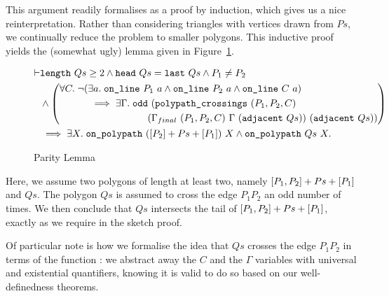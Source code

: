 This argument readily formalises as a proof by induction, which gives us a nice reinterpretation. Rather than considering triangles with vertices drawn from $Ps$, we continually reduce the problem to smaller polygons. This inductive proof yields the (somewhat ugly) lemma given in Figure~\ref{fig:oddCrossClosedPolypath}.

\begin{figure}
\begin{equation}\label{eq:oddCrossClosedPolypath}
  \begin{aligned}
    \vdash&\texttt{length}\ Qs \geq 2 \wedge \texttt{head}\ Qs = \texttt{last}\ Qs\wedge P_1\neq P_2\\
    &\wedge \left(\begin{aligned}&\forall C.\; \neg(\exists a.\; \texttt{on\_line}\ P_1\ a\wedge \texttt{on\_line}\ P_2\ a\wedge \texttt{on\_line}\ C\ a)\\
    &\qquad\quad \implies \exists \Gamma.\; \texttt{odd}\ (\texttt{polypath\_crossings}\ (P_1,P_2,C)\\
    &\qquad\quad\qquad\qquad\qquad(\Gamma_{final}\ (P_1,P_2,C)\ \Gamma\ (\texttt{adjacent}\ Qs))\ (\texttt{adjacent}\ Qs))\end{aligned}\right)\\
    &\implies\exists X.\; \texttt{on\_polypath}\ ([P_2] + Ps + [P_1])\ X \wedge \texttt{on\_polypath}\ Qs\ X.
  \end{aligned}
\end{equation}
\caption{Parity Lemma}
\label{fig:oddCrossClosedPolypath}
\end{figure}

Here, we assume two polygons of length at least two, namely $[P_1,P_2] + Ps + [P_1]$ and $Qs$. The polygon $Qs$ is assumed to cross the edge $P_1P_2$ an odd number of times. We then conclude that $Qs$ intersects the tail of $[P_1,P_2] + Ps + [P_1]$, exactly as we require in the sketch proof.

Of particular note is how we formalise the idea that $Qs$ crosses the edge $P_1P_2$ in terms of the function : we abstract away the $C$ and the $\Gamma$ variables with universal and existential quantifiers, knowing it is valid to do so based on our well-definedness theorems.

